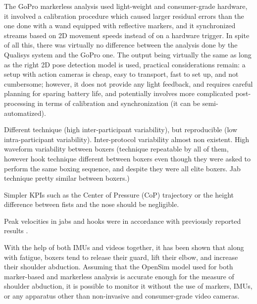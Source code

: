 The GoPro markerless analysis used light-weight and consumer-grade hardware, it involved a calibration procedure which caused larger residual errors than the one done with a wand equipped with reflective markers, and it synchronized streams based on 2D movement speeds instead of on a hardware trigger. In spite of all this, there was virtually no difference between the analysis done by the Qualisys system and the GoPro one. The output being virtually the same as long as the right 2D pose detection model is used, practical considerations remain: a setup with action cameras is cheap, easy to transport, fast to set up, and not cumbersome; however, it does not provide any light feedback, and requires careful planning for sparing battery life, and potentially involves more complicated post-processing in terms of calibration and synchronization (it can be semi-automatized).

Different technique (high inter-participant variability), but reproducible (low intra-participant variability). Inter-protocol variability almost non existent. High waveform variability between boxers (technique repeatable by all of them, however hook technique different between boxers even though they were asked to perform the same boxing sequence, and despite they were all elite boxers. Jab technique pretty similar between boxers.)

Simpler KPIs such as the Center of Pressure (CoP) trajectory or the height difference between fists and the nose should be negligible.

Peak velocities in jabs and hooks were in accordance with previously reported results \cite{Whiting1988,Piorkowski2011}.

With the help of both IMUs and videos together, it has been shown that along with fatigue, boxers tend to release their guard, lift their elbow, and increase their shoulder abduction. Assuming that the OpenSim model used for both marker-based and markerless analysis is accurate enough for the measure of shoulder abduction, it is possible to monitor it without the use of markers, IMUs, or any apparatus other than non-invasive and consumer-grade video cameras.  

